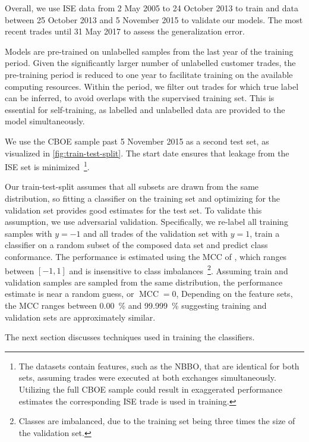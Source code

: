 Overall,  we use \gls{ISE} data from 2 May 2005 to 24 October 2013 to train and data between 25 October 2013 and 5 November 2015 to validate our models. The most recent trades until 31 May 2017 to assess the generalization error.

Models are pre-trained on unlabelled samples from the last year of the training period. Given the significantly larger number of unlabelled customer trades, the pre-training period is reduced to one year to facilitate training on the available computing resources. Within the period, we filter out trades for which true label can be inferred, to avoid overlaps with the supervised training set. This is essential for self-training, as labelled and unlabelled data are provided to the model simultaneously.

We use the \gls{CBOE} sample past 5 November 2015 as a second test set, as visualized in \cref{fig:train-test-split}. The start date ensures that leakage from the \gls{ISE} set is minimized~\footnote{The datasets contain features, such as the \gls{NBBO}, that are identical for both sets, assuming trades were executed at both exchanges simultaneously. Utilizing the full \gls{CBOE} sample could result in exaggerated performance estimates the corresponding \gls{ISE} trade is used in training.}.

Our train-test-split assumes that all subsets are drawn from the same distribution, so fitting a classifier on the training set and optimizing for the validation set provides good estimates for the test set. To validate this assumption, we use adversarial validation. Specifically, we re-label all training samples with $y=-1$ and all trades of the validation set with $y=1$, train a classifier on a random subset of the composed data set and predict class conformance. The performance is estimated using the \gls{MCC} of \textcite[][445]{matthewsComparisonPredictedObserved1975}, which ranges between $\left[-1, 1\right]$ and is insensitive to class imbalances~\footnote{Classes are imbalanced, due to the training set being three times the size of the validation set.}. Assuming train and validation samples are sampled from the same distribution, the performance estimate is near a random guess, or $\operatorname{MCC} = 0$, Depending on the feature sets, the \gls{MCC} ranges between \SI{0.00}{\percent} and \SI{99.999}{\percent} suggesting training and validation sets are approximately similar.

The next section discusses techniques used in training the classifiers.

